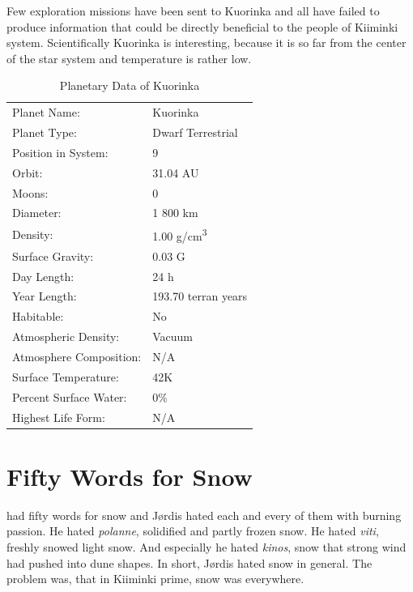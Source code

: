 \documentclass{tufte-book}
\begin{document}
Few exploration missions have been sent to Kuorinka and all have failed
to produce information that could be directly beneficial to the people 
of Kiiminki system. Scientifically Kuorinka is interesting, because it
is so far from the center of the star system and temperature is rather
low.

\bigskip
\begin{table}
\begin{minipage}{\textwidth}
\begin{center}
\begin{tabular}{ll}
\toprule
Planet Name: & Kuorinka \\
Planet Type: & Dwarf Terrestrial \\
Position in System: & 9 \\
Orbit: & 31.04 AU \\
Moons: & 0 \\
Diameter: & 1 800 km \\
Density: & 1.00 g/cm\textsuperscript{3} \\
Surface Gravity: & 0.03 G \\
Day Length: & 24 h \\
Year Length: & 193.70 terran years \\
Habitable: & No \\
\quad Atmospheric Density: & Vacuum \\
\quad Atmosphere Composition: & N/A \\
\quad Surface Temperature: & 42K \\
\quad Percent Surface Water: & 0\% \\
\quad Highest Life Form: & N/A \\

\bottomrule
\end{tabular}
\end{center}
\end{minipage}
\caption{Planetary Data of Kuorinka}
\end{table}


\chapter{Fifty Words for Snow}

 had fifty words for snow and
J\o rdis hated each and every of them with burning passion. He hated
\emph{polanne}, solidified and partly frozen snow. He hated \emph{viti}, 
freshly snowed light snow. And especially he hated \emph{kinos}, snow 
that strong wind had pushed into dune shapes. In short, J\o rdis hated 
snow in general. The problem was, that in Kiiminki prime, snow was 
everywhere.
\end{document}
